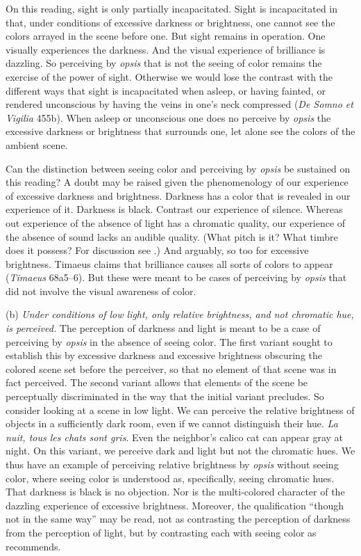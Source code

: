 On this reading, sight is only partially incapacitated. Sight is incapacitated in that, under conditions of excessive darkness or brightness, one cannot see the colors arrayed in the scene before one. But sight remains in operation. One visually experiences the darkness. And the visual experience of brilliance is dazzling. So perceiving by \emph{opsis} that is not the seeing of color remains the exercise of the power of sight. Otherwise we would lose the contrast with the different ways that sight is incapacitated when asleep, or having fainted, or rendered unconscious by having the veins in one's neck compressed (\emph{De Somno et Vigilia} 455b). When asleep or unconscious one does no perceive by \emph{opsis} the excessive darkness or brightness that surrounds one, let alone see the colors of the ambient scene.

Can the distinction between seeing color and perceiving by \emph{opsis} be sustained on this reading? A doubt may be raised given the phenomenology of our experience of excessive darkness and brightness. Darkness has a color that is revealed in our experience of it. Darkness is black. Contrast our experience of silence. Whereas out experience of the absence of light has a chromatic quality, our experience of the absence of sound lacks an audible quality. (What pitch is it? What timbre does it possess? For discussion see \citealt{Sorensen:2008kx,Sorensen:2009aa}.) And arguably, so too for excessive brightness. Timaeus claims that brilliance causes all sorts of colors to appear (\emph{Timaeus} 68a5–6). But these were meant to be cases of perceiving by \emph{opsis} that did not involve the visual awareness of color.

(b) \emph{Under conditions of low light, only relative brightness, and not chromatic hue, is perceived.} The perception of darkness and light is meant to be a case of perceiving by \emph{opsis} in the absence of seeing color. The first variant sought to establish this by excessive darkness and excessive brightness obscuring the colored scene set before the perceiver, so that no element of that scene was in fact perceived. The second variant allows that elements of the scene be perceptually discriminated in the way that the initial variant precludes. So consider looking at a scene in low light. We can perceive the relative brightness of objects in a sufficiently dark room, even if we cannot distinguish their hue. \emph{La nuit, tous les chats sont gris}. Even the neighbor's calico cat can appear gray at night. On this variant, we perceive dark and light but not the chromatic hues. We thus have an example of perceiving relative brightness by \emph{opsis} without seeing color, where seeing color is understood as, specifically, seeing chromatic hues. That darkness is black is no objection. Nor is the multi-colored character of the dazzling experience of excessive brightness. Moreover, the qualification ``though not in the same way'' may be read, not as contrasting the perception of darkness from the perception of light, but by contrasting each with seeing color as \citet[275]{Ross:1961uq} recommends.

